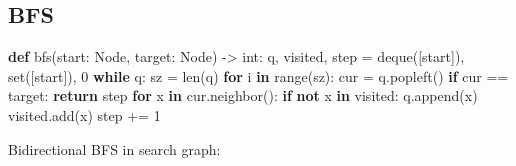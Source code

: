 \documentclass[
]{article}
\newenvironment{Shaded}{}{}
\newcommand{\BuiltInTok}[1]{#1}
\newcommand{\ControlFlowTok}[1]{\textcolor[rgb]{0.00,0.44,0.13}{\textbf{#1}}}
\newcommand{\DecValTok}[1]{\textcolor[rgb]{0.25,0.63,0.44}{#1}}
\newcommand{\KeywordTok}[1]{\textcolor[rgb]{0.00,0.44,0.13}{\textbf{#1}}}
\newcommand{\NormalTok}[1]{#1}
\newcommand{\OperatorTok}[1]{\textcolor[rgb]{0.40,0.40,0.40}{#1}}
\begin{document}
\hypertarget{bfs}{%
\subsection{BFS}\label{bfs}}

\begin{Shaded}
\begin{Highlighting}[]
\KeywordTok{def}\NormalTok{ bfs(start: Node, target: Node) }\OperatorTok{{-}\textgreater{}} \BuiltInTok{int}\NormalTok{:}
\NormalTok{    q, visited, step }\OperatorTok{=}\NormalTok{ deque([start]), }\BuiltInTok{set}\NormalTok{([start]), }\DecValTok{0}
   	\ControlFlowTok{while}\NormalTok{ q:}
\NormalTok{        sz }\OperatorTok{=} \BuiltInTok{len}\NormalTok{(q)}
        \ControlFlowTok{for}\NormalTok{ i }\KeywordTok{in} \BuiltInTok{range}\NormalTok{(sz):}
\NormalTok{            cur }\OperatorTok{=}\NormalTok{ q.popleft()}
            \ControlFlowTok{if}\NormalTok{ cur }\OperatorTok{==}\NormalTok{ target:}
                \ControlFlowTok{return}\NormalTok{ step}
            \ControlFlowTok{for}\NormalTok{ x }\KeywordTok{in}\NormalTok{ cur.neighbor():}
                \ControlFlowTok{if} \KeywordTok{not}\NormalTok{ x }\KeywordTok{in}\NormalTok{ visited:}
\NormalTok{                    q.append(x)}
\NormalTok{                    visited.add(x)}
\NormalTok{         step }\OperatorTok{+=} \DecValTok{1}
\end{Highlighting}
\end{Shaded}

Bidirectional BFS in search graph:
\end{document}
